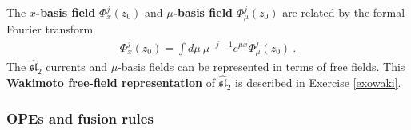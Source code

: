 \documentclass[12pt, a4paper, notitlepage, twoside]{report}
\numberwithin{equation}{section}
\theoremstyle{break}
\begin{document}
The \textbf{\boldmath $x$-basis field} $\Phi^j_x(z_0)$ and \textbf{\boldmath $\mu$-basis field} $\Phi^j_\mu(z_0)$ are related by the formal Fourier transform
\begin{align}
 \Phi_x^j(z_0) = \int d\mu\ \mu^{-j-1}e^{\mu x} \Phi_\mu^j(z_0)\ .
\label{emx}
\end{align}
The $\widehat{\mathfrak{sl}}_2$ currents and $\mu$-basis fields can be represented in terms of free fields.
This \textbf{Wakimoto free-field representation} of $\widehat{\mathfrak{sl}}_2$ is described in Exercise \ref{exowaki}.

\subsubsection{OPEs and fusion rules}
\end{document}

